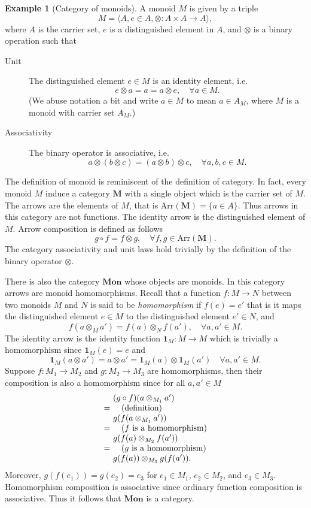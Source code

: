 \documentclass[10pt,twoside,a4paper]{article}
\makeatletter
\newcounter{theorem}
\theoremstyle{plain}
\theoremstyle{definition}
\newtheorem{example}{Example}[section]
\newcommand{\ba}{\begin{array}}
\newcommand{\ea}{\end{array}}
\newenvironment{derivation}{\small\[\ba{@{}r@{~}l@{}}}{\ea\]\normalsize\ignorespacesafterend}
\newcommand{\reason}[1]{\quad (\text{#1})}
\newcommand{\Id}[1]{%
  \ensuremath{\mathbf{1}_{#1}}%
}
\newcommand{\Arr}[1]{%
  \ensuremath{\mathrm{Arr}(#1)}%
}
\newcommand{\Catname}[1]{%
  \ensuremath{\mathbf{#1}}%
}
\newcommand{\Mon}[0]{\Catname{Mon}}
\newcommand{\Tuple}[1]{%
  \ensuremath{\langle #1 \rangle}%
}
\makeatother
\begin{document}
\begin{example}[Category of monoids]
A monoid $M$ is given by a triple
\[ M = \Tuple{A,e \in A, \otimes : A \times A \to A}, \]
where $A$ is the carrier set, $e$ is a distinguished element in $A$,
and $\otimes$ is a binary operation such that
\begin{description}
\item[Unit] The distinguished element $e \in M$ is an identity
  element, i.e.
  \[ e \otimes a = a = a \otimes e, \quad \forall a \in M. \]
  (We abuse notation a bit and write $a \in M$ to mean $a \in A_M$,
  where $M$ is a monoid with carrier set $A_M$.)
  \item[Associativity] The binary operator is associative, i.e.
    \[  a \otimes (b \otimes c) = (a \otimes b) \otimes c, \quad \forall a,b,c \in M. \]
\end{description}
The definition of monoid is reminiscent of the definition of
category. In fact, every monoid $M$ induce a category \Catname{M} with
a single object which is the carrier set of $M$. The arrows are the
elements of $M$, that is $\Arr{\Catname{M}} = \{ a \in A \}$. Thus
arrows in this category are not functions. The identity arrow is the
distinguished element of $M$. Arrow composition is defined as follows
%
\[ g \circ f = f \otimes g, \quad \forall f,g \in \Arr{\Catname{M}}. \]
%
The category associativity and unit laws hold trivially by the
definition of the binary operator $\otimes$.

There is also the category \Mon{} whose objects are monoids. In this
category arrows are monoid homomorphisms. Recall that a function
$f : M \to N$ between two monoids $M$ and $N$ is said to be
\emph{homomorphism} if $f(e) = e'$ that is it maps the distinguished
element $e \in M$ to the distinguished element $e' \in N$, and
%
\[ f(a \otimes_M a') = f(a) \otimes_N f(a'), \quad \forall a,a' \in M. \]
%
The identity arrow is the identity function $\Id{M} : M \to M$ which
is trivially a homomorphism since $\Id{M}(e) = e$ and
\[ \Id{M}(a \otimes a') = a \otimes a' = \Id{M}(a) \otimes \Id{M}(a') \quad \forall a,a' \in M. \]
%
Suppose $f : M_1 \to M_2$ and $g : M_2 \to M_3$ are homomorphisms,
then their composition is also a homomorphism since for all
$a, a' \in M$
\begin{derivation}
  & (g \circ f)(a \otimes_{M_1} a') \\
  =& \reason{definition} \\
  & g(f(a \otimes_{M_1} a')) \\
  =& \reason{$f$ is a homomorphism} \\
  & g(f(a) \otimes_{M_2} f(a')) \\
  =& \reason{$g$ is a homomorphism} \\
  & g(f(a)) \otimes_{M_3} g(f(a')).
\end{derivation}
Moreover, $g(f(e_1)) = g(e_2) = e_3$ for $e_1 \in M_1$, $e_2 \in
M_2$, and $e_3 \in M_3$.  Homomorphism composition is associative
since ordinary function composition is associative. Thus it follows
that \Mon{} is a category.
\end{example}

%
%


\end{document}
